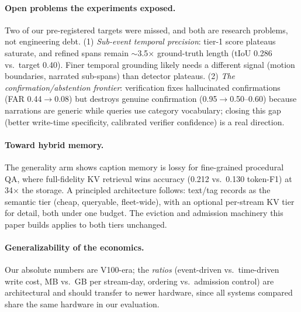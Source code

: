 \paragraph{Open problems the experiments exposed.} Two of our pre-registered targets were missed, and both are research problems, not engineering debt. (1) \emph{Sub-event temporal precision}: tier-1 score plateaus saturate, and refined spans remain $\sim$3.5$\times$ ground-truth length (tIoU 0.286 vs.\ target 0.40). Finer temporal grounding likely needs a different signal (motion boundaries, narrated sub-spans) than detector plateaus. (2) \emph{The confirmation/abstention frontier}: verification fixes hallucinated confirmations (FAR 0.44$\to$0.08) but destroys genuine confirmation (0.95$\to$0.50--0.60) because narrations are generic while queries use category vocabulary; closing this gap (better write-time specificity, calibrated verifier confidence) is a real direction.

\paragraph{Toward hybrid memory.} The generality arm shows caption memory is lossy for fine-grained procedural QA, where full-fidelity KV retrieval wins accuracy (0.212 vs.\ 0.130 token-F1) at 34$\times$ the storage. A principled architecture follows: text/tag records as the semantic tier (cheap, queryable, fleet-wide), with an optional per-stream KV tier~\cite{rekv,livevlm} for detail, both under one budget. The eviction and admission machinery this paper builds applies to both tiers unchanged.

\paragraph{Generalizability of the economics.} Our absolute numbers are V100-era; the \emph{ratios} (event-driven vs.\ time-driven write cost, MB vs.\ GB per stream-day, ordering vs.\ admission control) are architectural and should transfer to newer hardware, since all systems compared share the same hardware in our evaluation.
